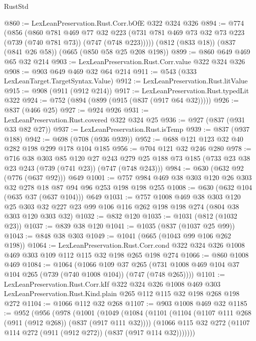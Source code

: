 \begin{lexlean}{RustStd}
\begin{coremodule}
@860 := LexLeanPreservation.Rust.Corr.bOfE @322 @324 @326
@894 := @774
    (@856
      (@860
        @781
        @469
        @77
        @32
        @223
        (@731 @781 @469 @73 @32 @73 @223 (@739 (@740 @781 @73)) (@747 (@748 @223)))))
    (@812 (@833 @18))
    (@837 (@841 @26 @58))
    (@665 (@850 @58 @25 @208 @198))
@899 := @860 @649 @469 @65 @32 @214
@903 := LexLeanPreservation.Rust.Corr.value @322 @324 @326
@908 := @903 @649 @469 @32 @64 @214
@911 := @543 (@333 LexLeanTarget.TargetSyntax.Value)
@912 := LexLeanPreservation.Rust.litValue
@915 := @908 (@911 (@912 @214))
@917 := LexLeanPreservation.Rust.typedLit @322
@924 := @752 (@894 (@899 (@915 (@837 (@917 @64 @32)))))
@926 := @837 (@466 @25)
@927 := @924 @926
@931 := LexLeanPreservation.Rust.covered @322 @324 @25
@936 := @927 (@837 (@931 @33 @82 @27))
@937 := LexLeanPreservation.Rust.isTemp
@939 := @837 (@937 @188)
@942 := @698 (@708 (@936 @939))
@952 := @688 @121 @123 @32 @40 @282 @198 @299 @178 @104 @185
@956 := @704 @121 @32 @246 @280
@978 := @716
    @38
    @303
    @85
    @120
    @27
    @243
    @279
    @25
    @188
    @73
    @185
    (@733 @23 @38 @23 @243 (@739 (@741 @23)) (@747 (@748 @243)))
@984 := @630 (@632 @92 (@776 (@637 @92))) @649
@1001 := @757 @984 @469 @38 @303 @120 @26 @303 @32 @278 @18 @87 @94 @96 @253 @198 @198 @255
@1008 := @630 (@632 @104 (@635 @37 (@637 @104))) @649
@1031 := @757
    @1008
    @469
    @38
    @303
    @120
    @25
    @303
    @32
    @227
    @23
    @99
    @106
    @116
    @262
    @198
    @198
    @274
    (@804 @38 @303 @120 @303 @32)
@1032 := @832 @120
@1035 := @1031 (@812 (@1032 @23))
@1037 := @839 @38 @120
@1041 := @1035 (@837 (@1037 @25 @99))
@1043 := @848 @38 @303
@1049 := @1041 (@665 (@1043 @99 @106 @262 @198))
@1064 := LexLeanPreservation.Rust.Corr.cond
    @322
    @324
    @326
    @1008
    @469
    @303
    @109
    @112
    @115
    @32
    @198
    @265
    @198
    @274
@1066 := @860 @1008 @469
@1084 := @1064
    (@1066
      @109
      @37
      @265
      (@731 @1008 @469 @104 @37 @104 @265 (@739 (@740 @1008 @104)) (@747 (@748 @265))))
@1101 := LexLeanPreservation.Rust.Corr.kIf
    @322
    @324
    @326
    @1008
    @469
    @303
    LexLeanPreservation.Rust.Kind.plain
    @265
    @112
    @115
    @32
    @198
    @268
    @198
    @272
@1104 := @1066 @112 @32 @268
@1107 := @903 @1008 @469 @32
@1185 := @952
    (@956
      (@978
        (@1001
          (@1049
            (@1084
              (@1101
                (@1104 (@1107 @111 @268 (@911 (@912 @268)) (@837 (@917 @111 @32))))
                (@1066 @115 @32 @272 (@1107 @114 @272 (@911 (@912 @272)) (@837 (@917 @114 @32)))))))

\end{coremodule}
\end{lexlean}
